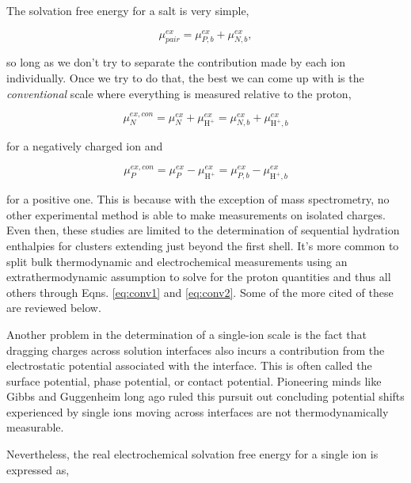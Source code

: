 \begin{intro}
   The solvation free energy for a salt is very simple,
   
   \begin{equation}\label{eq:pairmu}
       \mu^{ex}_{pair} = \mu^{ex}_{P,b} + \mu^{ex}_{N,b},
   \end{equation}

   \noindent so long as we don't try to separate the contribution made by each ion individually. Once we try to do that, the best we can come up with is the \emph{conventional}
   scale where everything is measured relative to the proton,
   
   \begin{equation}
     \mu_N^{ex,con} =  \mu^{ex}_{N} + \mu^{ex}_{\mathrm{H}^+} = \mu^{ex}_{N,b} + \mu^{ex}_{\mathrm{H}^+,b}
     \label{eq:conv1}
   \end{equation}

   \noindent for a negatively charged ion and

   \begin{equation}
     \mu_P^{ex,con} =  \mu^{ex}_{P} - \mu^{ex}_{\mathrm{H}^+} = \mu^{ex}_{P,b} - \mu^{ex}_{\mathrm{H}^+,b}
     \label{eq:conv2}
   \end{equation}   
   
   \noindent for a positive one. This is because with the exception of mass spectrometry, no other experimental method is able to make measurements on isolated charges. Even
   then, these studies are limited to the determination of sequential hydration enthalpies for clusters extending just beyond the first shell. It's more common to split
   bulk thermodynamic and electrochemical measurements using an extrathermodynamic assumption to solve for the proton quantities and thus all others through Eqns. \ref{eq:conv1}
   and \ref{eq:conv2}. Some of the more cited of these are reviewed below.
  
   Another problem in the determination of a single-ion scale is the fact that dragging charges across solution interfaces also incurs a contribution from the electrostatic 
   potential associated with the interface. This is often called the surface potential, phase potential, or contact potential\cite{lamoureux2006absolute,pratt1992contact}. 
   Pioneering minds like Gibbs and Guggenheim long ago ruled this pursuit out concluding potential shifts experienced by single ions moving across interfaces are not 
   thermodynamically measurable\cite{gibbs1,guggenheim28,guggenheim-td}.
   
   Nevertheless, the real electrochemical solvation free energy for a single ion is expressed as\cite{aquaincognita2014,pratt1992contact,fawcett,beck2013sp},
   

\end{intro}
